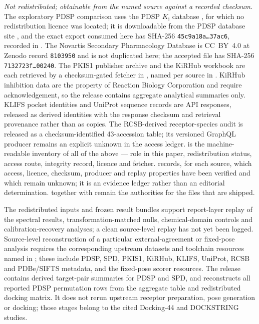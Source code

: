 \emph{Not redistributed; obtainable from the named source against a recorded
checksum.}  The exploratory PDSP comparison uses the PDSP $K_\mathrm{i}$ database
\cite{pdsp2000}, for which no redistribution licence was located; it is
downloadable from the PDSP database site \cite{pdspdatabase}, and the exact export
consumed here has SHA-256 \texttt{45c9a18a\ldots37ac6},
recorded in .  The
Novartis Secondary Pharmacology Database \cite{sutherland2023} is CC~BY~4.0 at
Zenodo record \texttt{8103950} and is not duplicated here; the accepted file has
SHA-256 \texttt{7132723f\ldots00240}.  The PKIS1 publisher archive
\cite{elkins2016} and the KiRHub workbook \cite{saifudeen2026} are each retrieved by a checksum-gated
fetcher in , named per source in .
KiRHub inhibition data are the
property of Reaction Biology Corporation and require acknowledgement, so the
release contains aggregate analytical summaries only.  KLIFS pocket identities
\cite{klifs2021} and UniProt sequence records are API responses, released as
derived identities with the response checksum and retrieval provenance rather
than as copies.  The RCSB-derived receptor-species audit is released as a
checksum-identified 43-accession table; its versioned GraphQL producer remains
an explicit unknown in the access ledger.   is the machine-readable inventory of
all of the above --- role in this paper, redistribution status, access route,
integrity record, licence and fetcher.   records, for
each source, which access, licence, checksum, producer and replay properties have
been verified and which remain unknown; it is an evidence ledger rather than an
editorial determination.   together with
 remain the authorities for the files that are shipped.

The redistributed inputs and frozen result bundles support report-layer replay of the
spectral results, transformation-matched nulls, chemical-domain controls and
calibration-recovery analyses; a clean source-level replay has not yet been logged.
Source-level reconstruction of a particular external-agreement or
fixed-pose analysis requires the corresponding upstream datasets and toolchain
resources named in ; these include PDSP, SPD, PKIS1,
KiRHub, KLIFS, UniProt, RCSB and PDBe/SIFTS metadata, and the fixed-pose scorer resources.  The
release contains derived target-pair summaries for PDSP and SPD, and
 reconstructs all reported PDSP
permutation rows from the aggregate table and redistributed docking matrix.  It
does not rerun upstream
receptor preparation, pose generation or docking; those stages belong to the
cited Docking-44 and DOCKSTRING studies.

